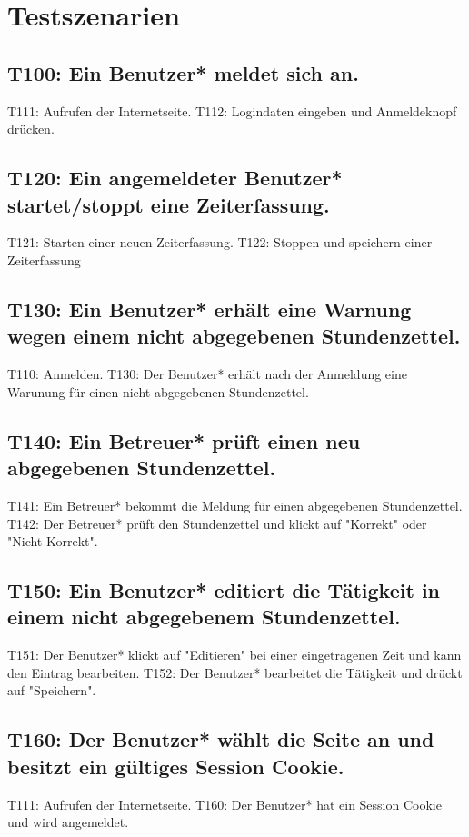 \section{Testszenarien}


\subsection{T100: Ein Benutzer* meldet sich an.}
T111: Aufrufen der Internetseite.
T112: Logindaten eingeben und Anmeldeknopf drücken.

\subsection{T120: Ein angemeldeter Benutzer* startet/stoppt eine Zeiterfassung.}
T121: Starten einer neuen Zeiterfassung.
T122: Stoppen und speichern einer Zeiterfassung

\subsection{T130: Ein Benutzer* erhält eine Warnung wegen einem nicht abgegebenen Stundenzettel.}
T110: Anmelden.
T130: Der Benutzer* erhält nach der Anmeldung eine Warunung für einen nicht abgegebenen Stundenzettel.

\subsection{T140: Ein Betreuer* prüft einen neu abgegebenen Stundenzettel.}
T141: Ein Betreuer* bekommt die Meldung für einen abgegebenen Stundenzettel.
T142: Der Betreuer* prüft den Stundenzettel und klickt auf "Korrekt" oder "Nicht Korrekt".

\subsection{T150: Ein Benutzer* editiert die Tätigkeit in einem nicht abgegebenem Stundenzettel.}
T151: Der Benutzer* klickt auf "Editieren" bei einer eingetragenen Zeit und kann den Eintrag bearbeiten.
T152: Der Benutzer* bearbeitet die Tätigkeit und drückt auf "Speichern".

\subsection{T160: Der Benutzer* wählt die Seite an und besitzt ein gültiges Session Cookie.}
T111: Aufrufen der Internetseite.
T160: Der Benutzer* hat ein Session Cookie und wird angemeldet.

